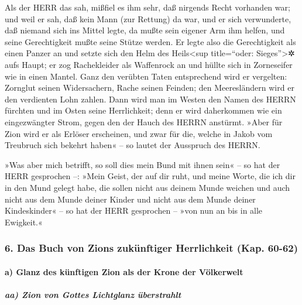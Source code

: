 Als der HERR das sah, mißfiel es ihm sehr, daß nirgends Recht vorhanden
war; und weil er sah, daß kein Mann (zur Rettung) da war,
und er sich verwunderte, daß niemand sich ins Mittel legte, da mußte
sein eigener Arm ihm helfen, und seine Gerechtigkeit mußte seine Stütze
werden. Er legte also die Gerechtigkeit als einen Panzer
an und setzte sich den Helm des Heils\textless sup title=``oder:
Sieges''\textgreater✲ aufs Haupt; er zog Rachekleider als Waffenrock an
und hüllte sich in Zorneseifer wie in einen Mantel. Ganz
den verübten Taten entsprechend wird er vergelten: Zornglut seinen
Widersachern, Rache seinen Feinden; den Meeresländern wird er den
verdienten Lohn zahlen. Dann wird man im Westen den Namen
des HERRN fürchten und im Osten seine Herrlichkeit; denn er wird
daherkommen wie ein eingezwängter Strom, gegen den der Hauch des HERRN
anstürmt. »Aber für Zion wird er als Erlöser erscheinen,
und zwar für die, welche in Jakob vom Treubruch sich bekehrt haben« --
so lautet der Ausspruch des HERRN.

»Was aber mich betrifft, so soll dies mein Bund mit ihnen
sein« -- so hat der HERR gesprochen --: »Mein Geist, der auf dir ruht,
und meine Worte, die ich dir in den Mund gelegt habe, die sollen nicht
aus deinem Munde weichen und auch nicht aus dem Munde deiner Kinder und
nicht aus dem Munde deiner Kindeskinder« -- so hat der HERR gesprochen
-- »von nun an bis in alle Ewigkeit.«

\hypertarget{das-buch-von-zions-zukuxfcnftiger-herrlichkeit-kap.-60-62}{%
\subsubsection{6. Das Buch von Zions zukünftiger Herrlichkeit (Kap.
60-62)}\label{das-buch-von-zions-zukuxfcnftiger-herrlichkeit-kap.-60-62}}

\hypertarget{a-glanz-des-kuxfcnftigen-zion-als-der-krone-der-vuxf6lkerwelt}{%
\paragraph{a) Glanz des künftigen Zion als der Krone der
Völkerwelt}\label{a-glanz-des-kuxfcnftigen-zion-als-der-krone-der-vuxf6lkerwelt}}

\hypertarget{aa-zion-von-gottes-lichtglanz-uxfcberstrahlt}{%
\subparagraph{aa) Zion von Gottes Lichtglanz
überstrahlt}\label{aa-zion-von-gottes-lichtglanz-uxfcberstrahlt}}

